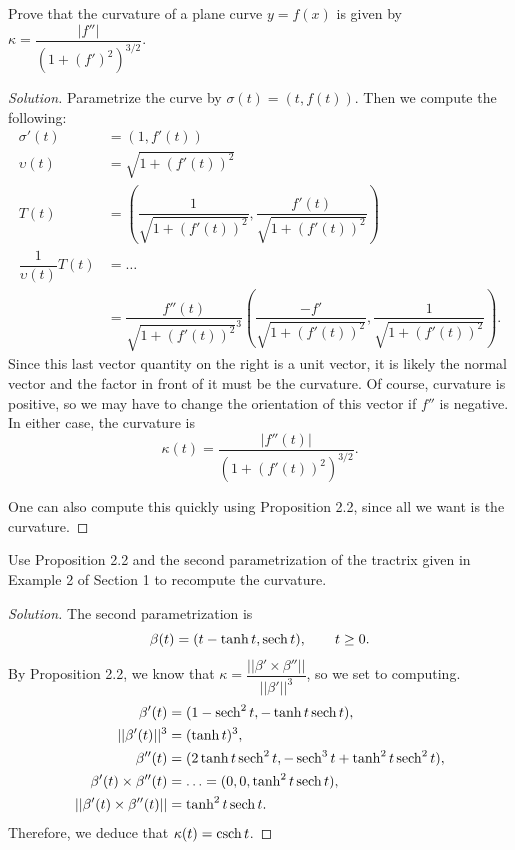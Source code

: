 \documentclass[Shifrin_Solutions_Spring_2018]{subfiles}
\begin{document}


\begin{exercise}
Prove that the curvature of a plane curve $y=f(x)$ is given by $\displaystyle \kappa = \dfrac{|f''|}{(1+(f')^2)^{3/2}}$.
\end{exercise}

\begin{proof}[Solution]
Parametrize the curve by $\sigma(t) = ( t, f(t) )$. Then we compute the following:
\begin{align*}
\sigma'(t) & = (1, f'(t) ) \\
\upsilon(t) & = \sqrt{1 + (f'(t))^2} \\
T(t) & = \left( \dfrac{1}{\sqrt{1 + (f'(t))^2} } , \dfrac{f'(t)}{\sqrt{1 + (f'(t))^2}} \right) \\
\dfrac{1}{\upsilon(t)} T(t) & = \ldots \\
& = \dfrac{f''(t)}{\sqrt{1 + (f'(t))^2}^3} \left( \dfrac{- f'}{\sqrt{1 + (f'(t))^2}} , \dfrac{1}{\sqrt{1 + (f'(t))^2}} \right) .
\end{align*}
Since this last vector quantity on the right is a unit vector, it is likely the normal vector and the factor in front of it must be the curvature. Of course, curvature is positive, so we may have to change the orientation of this vector if $f''$ is negative. In either case, the curvature is
\[
\kappa(t) = \dfrac{|f''(t)|}{(1 + (f'(t))^2)^{3/2}}  .
\]

One can also compute this quickly using Proposition 2.2, since all we want is the curvature.
\end{proof}




\begin{exercise}
Use Proposition 2.2 and the second parametrization of the tractrix given in Example 2 of Section 1 to recompute the curvature.
\end{exercise}

\begin{proof}[Solution]
The second parametrization is
\[
\beta(t) = (t-\tanh t , \operatorname{\mathrm{sech}} t ), \qquad t\geq 0.
\]
By Proposition 2.2, we know that $\kappa = \dfrac{||\beta' \times \beta''||}{||\beta'||^3}$, so we set to computing.
\begin{align*}
\beta'(t) & = ( 1 - \operatorname{\mathrm{sech}}^2 t , -\tanh t \operatorname{\mathrm{sech}} t ) , \\
||\beta'(t) ||^3 & = (\tanh t)^3 , \\
\beta''(t) & = ( 2\tanh t \operatorname{\mathrm{sech}}^2 t , -\operatorname{\mathrm{sech}}^3 t + \tanh^2 t \operatorname{\mathrm{sech}}^2 t ) , \\
\beta'(t) \times \beta''(t) &= \ldots = (0,0, \tanh^2 t \operatorname{\mathrm{sech}} t ) , \\
||\beta'(t) \times \beta''(t)|| & = \tanh^2 t \operatorname{\mathrm{sech}} t .
\end{align*}
Therefore, we deduce that $\kappa(t) = \operatorname{\mathrm{csch}} t$.
\end{proof}
\end{document}
